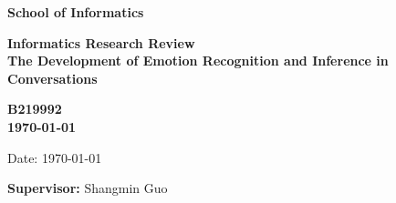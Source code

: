 \documentclass[a4paper,11pt]{article}
\newcommand{\examnumber}{B219992}
\newcommand{\field}{The Development of Emotion Recognition and Inference in Conversations}
\newcommand{\supervisor}{Shangmin Guo}
\begin{document}
\begin{minipage}[b]{110mm}
        {\Huge\bf School of Informatics
        \vspace*{17mm}}
\end{minipage}
\hfill
\begin{minipage}[t]{40mm}               
\end{minipage}
\par\noindent
\vspace*{2cm}
\begin{center}
        \Large\bf Informatics Research Review \\
        \Large\bf \field
\end{center}
\vspace*{1.5cm}
\begin{center}
        \bf \examnumber\\
        \monthyeardate\today
\end{center}
\vspace*{5mm}

%
%                       
\begin{abstract}
        
\end{abstract}

\vspace*{1cm}

\vspace*{3cm}
Date: \today

\vfill
{\bf Supervisor:} \supervisor
\newpage

\setcounter{page}{1}                            %
\footruleheight{1pt}
\headruleheight{1pt}
\rhead{- \thepage}
\cfoot{}
%
\end{document}
